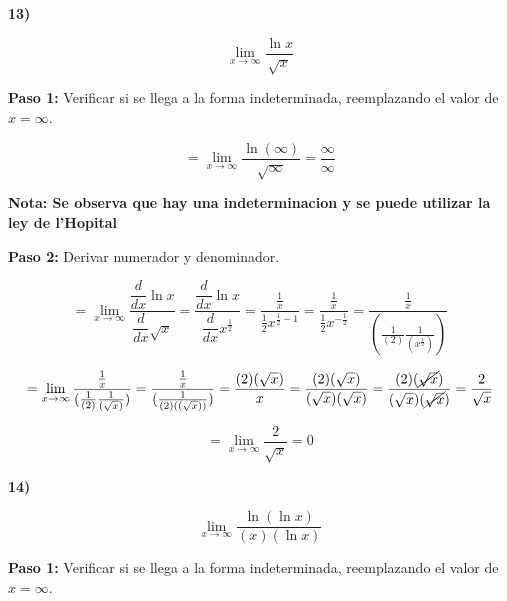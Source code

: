 \documentclass[12pt,a4paper]{article}
\begin{document}
\newpage


\textbf{13)}

\[
\lim_{x \to \infty} \frac{\ln x}{\sqrt{x}} 
\]

\vspace{0.2cm}

\textbf{Paso 1:}
\vspace{0.2cm}
Verificar si se llega a la forma indeterminada, reemplazando el valor de $x=\infty$.

\[
= \lim_{x \to \infty} \frac{\ln (\infty)}{\sqrt{\infty}}= \frac{\infty}{\infty}
\]

\vspace{0.2cm}

\textbf{Nota: Se observa que hay una indeterminacion y se puede utilizar la ley de l'Hopital }

\vspace{0.5cm}

\textbf{Paso 2:}
\vspace{0.2cm}
Derivar numerador y denominador.

\[
= \lim_{x \to \infty} \frac{\dfrac{d}{dx} \ln x}{\dfrac{d}{dx} \sqrt{x}}= \frac{\dfrac{d}{dx} \ln x}{\dfrac{d}{dx} x^{\frac{1}{2}}}= \frac{\frac{1}{x}}{\frac{1}{2}x^{\frac{1}{2}-1}}= \frac{\frac{1}{x}}{\frac{1}{2}x^{-\frac{1}{2}}}= \frac{\frac{1}{x}}{(\frac{1}{(2)} \frac{1}{(x^{\frac{1}{2}})})}
\]

\[
= \lim_{x \to \infty}  \frac{\frac{1}{x}}{(\frac{1}{(2)} \frac{1}{(\sqrt{x})})}= \frac{\frac{1}{x}}{(\frac{1}{(2)((\sqrt{x}))})}= \frac{(2) (\sqrt{x})}{x}=  \frac{(2) (\sqrt{x})}{(\sqrt{x})(\sqrt{x})}= \frac{(2) (\cancel{\sqrt{x}})}{(\sqrt{x})(\cancel{\sqrt{x}})}= \frac{2}{\sqrt{x}}
\]

\vspace{0.2cm}

\begin{center}
\end{center}

\[
= \lim_{x \to \infty} \frac{2}{\sqrt{x}} = 0
\]

\newpage



\textbf{14)}

\[
\lim_{x \to \infty} \frac{\ln(\ln x)}{(x)(\ln x)} 
\]

\vspace{0.2cm}

\textbf{Paso 1:}
\vspace{0.2cm}
Verificar si se llega a la forma indeterminada, reemplazando el valor de $x=\infty$.
\end{document}
